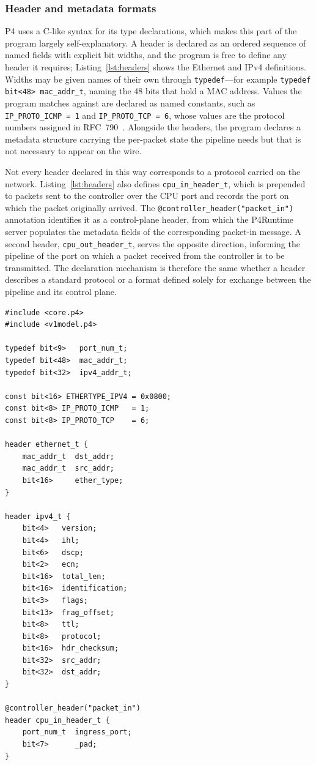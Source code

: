 \subsubsection{Header and metadata formats}
P4 uses a C-like syntax for its type declarations, which makes this part of the program largely self-explanatory. A header is declared as an ordered sequence of named fields with explicit bit widths, and the program is free to define any header it requires; Listing~\ref{lst:headers} shows the Ethernet and IPv4 definitions. Widths may be given names of their own through \texttt{typedef}---for example \texttt{typedef bit<48> mac\_addr\_t}, naming the 48 bits that hold a MAC address. Values the program matches against are declared as named constants, such as \texttt{IP\_PROTO\_ICMP = 1} and \texttt{IP\_PROTO\_TCP = 6}, whose values are the protocol numbers assigned in RFC~790~\cite{rfc790}. Alongside the headers, the program declares a metadata structure carrying the per-packet state the pipeline needs but that is not necessary to appear on the wire.

Not every header declared in this way corresponds to a protocol carried on the network. Listing~\ref{lst:headers} also defines \texttt{cpu\_in\_header\_t}, which is prepended to packets sent to the controller over the CPU port and records the port on which the packet originally arrived. The \texttt{@controller\_header("packet\_in")} annotation identifies it as a control-plane header, from which the P4Runtime server populates the metadata fields of the corresponding packet-in message. A second header, \texttt{cpu\_out\_header\_t}, serves the opposite direction, informing the pipeline of the port on which a packet received from the controller is to be transmitted. The declaration mechanism is therefore the same whether a header describes a standard protocol or a format defined solely for exchange between the pipeline and its control plane.

\begin{lstlisting}[caption={Header definitions in \texttt{main.p4}.},label={lst:headers}]
#include <core.p4>
#include <v1model.p4>

typedef bit<9>   port_num_t;
typedef bit<48>  mac_addr_t;
typedef bit<32>  ipv4_addr_t;

const bit<16> ETHERTYPE_IPV4 = 0x0800;
const bit<8> IP_PROTO_ICMP   = 1;
const bit<8> IP_PROTO_TCP    = 6;

header ethernet_t {
    mac_addr_t  dst_addr;
    mac_addr_t  src_addr;
    bit<16>     ether_type;
}

header ipv4_t {
    bit<4>   version;
    bit<4>   ihl;
    bit<6>   dscp;
    bit<2>   ecn;
    bit<16>  total_len;
    bit<16>  identification;
    bit<3>   flags;
    bit<13>  frag_offset;
    bit<8>   ttl;
    bit<8>   protocol;
    bit<16>  hdr_checksum;
    bit<32>  src_addr;
    bit<32>  dst_addr;
}

@controller_header("packet_in")
header cpu_in_header_t {
    port_num_t  ingress_port;
    bit<7>      _pad;
}
\end{lstlisting}


